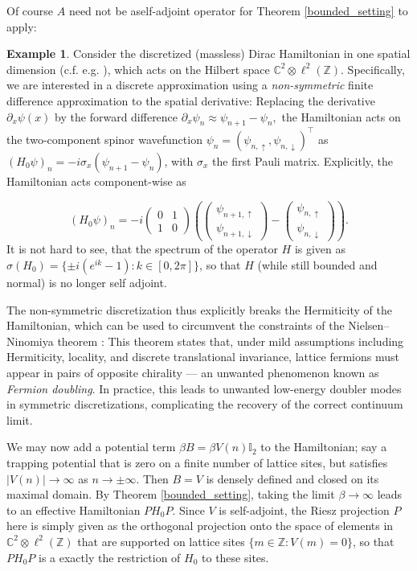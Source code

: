 \documentclass[reqno,12pt,letterpaper]{amsart}
\numberwithin{equation}{section}
\newcommand{\1}{\mathds{1}}
\theoremstyle{definition}
\newtheorem{Ex}[Th]{Example}
\begin{document}
Of course $A$  need not be  aself-adjoint operator for Theorem \ref{bounded_setting} to apply:	
	\begin{Ex}\label{discretization_example}
Consider the discretized (massless) Dirac Hamiltonian in one spatial dimension (c.f. e.g. \cite{Cornean2023, Koke2016, Koke2020}), which acts on the Hilbert space $\mathds{C}^2 \otimes \ell^2(\mathds{Z})$.
Specifically, we are interested in a discrete approximation using a \textit{non-symmetric} finite difference approximation to the spatial derivative: Replacing the derivative \(\partial_x \psi(x)\) by the forward difference $
	\partial_x \psi_n \approx \psi_{n+1} - \psi_n,
	$
	the Hamiltonian acts on the two-component spinor wavefunction \(\psi_n = (\psi_{n,\uparrow} ,  \psi_{n,\downarrow})^\intercal\) as
	$
	(H_0 \psi)_n = -i \sigma_x (\psi_{n+1} - \psi_n) 
	$,
	with
	 \(\sigma_x
\)  the first Pauli matrix.
	Explicitly, the Hamiltonian acts component-wise as
	
	\[
	(H_0 \psi)_n =
	- i 
	\begin{pmatrix}
		0 & 1 \\
		1 & 0
	\end{pmatrix}
	\left(
	\begin{pmatrix}
		\psi_{n+1, \uparrow} \\
		\psi_{n+1, \downarrow}
	\end{pmatrix}
	-
	\begin{pmatrix}
		\psi_{n, \uparrow} \\
		\psi_{n, \downarrow}
	\end{pmatrix}
	\right)
	.
	\]
	It is not hard to see, that the spectrum of the operator $H$ is given as $\sigma(H_0) = \{ \pm i(e^{ik} -1) : k \in [0, 2 \pi]\}$, so that $H$ (while still bounded and normal) is no longer self adjoint. 
	
	The non-symmetric discretization thus explicitly breaks the Hermiticity of the Hamiltonian, which can be used to circumvent the constraints of the Nielsen– Ninomiya theorem \cite{nakamura2024remarks}: This theorem states that, under mild assumptions including Hermiticity, locality, and discrete translational invariance, lattice fermions must appear in pairs of opposite chirality --- an unwanted phenomenon known as \emph{Fermion doubling}. In practice, this leads to unwanted low-energy doubler modes in symmetric discretizations, complicating the recovery of the correct continuum limit.

	
	We may now add a potential term $\beta B = \beta V(n)  \mathbb{I}_2$ to the Hamiltonian; say a trapping potential that is zero on a finite number of lattice sites, but satisfies $|V(n)| \rightarrow \infty$ as $n \rightarrow \pm \infty$. Then  $B=V$ is  densely defined and closed on its maximal domain. By Theorem \ref{bounded_setting}, taking the limit $\beta \rightarrow \infty$ leads to an effective Hamiltonian $PH_0P$. 
	Since $V$ is self-adjoint, the Riesz projection $P$ here is simply given as the orthogonal projection onto the space of elements in $ \mathds{C}^2 \otimes \ell^2(\mathds{Z})$ that are supported on lattice sites $\{m \in \mathds{Z}: V(m) = 0\}$, so that $PH_0P$ is a exactly the restriction of $H_0$ to these sites.
\end{Ex}	
\end{document}
